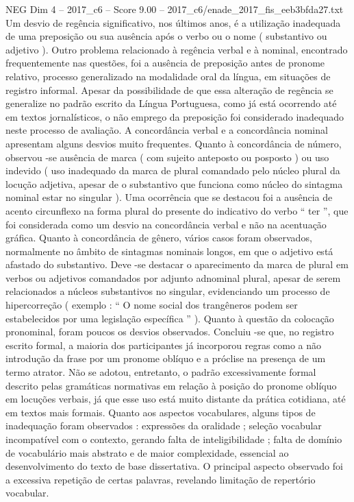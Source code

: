 \begin{textsample}{NEG Dim 4 – 2017\_c6 – Score 9.00 – 2017\_c6/enade\_2017\_fis\_eeb3bfda27.txt}
Um desvio de regência significativo, nos últimos anos, é a utilização inadequada de uma preposição ou sua ausência após o verbo ou o nome ( substantivo ou adjetivo ).
Outro problema relacionado à regência verbal e à nominal, encontrado frequentemente nas questões, foi a ausência de preposição antes de pronome relativo, processo generalizado na modalidade oral da língua, em situações de registro informal.
Apesar da possibilidade de que essa alteração de regência se generalize no padrão escrito da Língua Portuguesa, como já está ocorrendo até em textos jornalísticos, o não emprego da preposição foi considerado inadequado neste processo de avaliação.
A concordância verbal e a concordância nominal apresentam alguns desvios muito frequentes.
Quanto à concordância de número, observou -se ausência de marca ( com sujeito anteposto ou posposto ) ou uso indevido ( uso inadequado da marca de plural comandado pelo núcleo plural da locução adjetiva, apesar de o substantivo que funciona como núcleo do sintagma nominal estar no singular ).
Uma ocorrência que se destacou foi a ausência de acento circunflexo na forma plural do presente do indicativo do verbo “ ter ”, que foi considerada como um desvio na concordância verbal e não na acentuação gráfica.
Quanto à concordância de gênero, vários casos foram observados, normalmente no âmbito de sintagmas nominais longos, em que o adjetivo está afastado do substantivo.
Deve -se destacar o aparecimento da marca de plural em verbos ou adjetivos comandados por adjunto adnominal plural, apesar de serem relacionados a núcleos substantivos no singular, evidenciando um processo de hipercorreção ( exemplo : “ O nome social dos trangêneros podem ser estabelecidos por uma legislação específica ” ).
Quanto à questão da colocação pronominal, foram poucos os desvios observados.
Concluiu -se que, no registro escrito formal, a maioria dos participantes já incorporou regras como a não introdução da frase por um pronome oblíquo e a próclise na presença de um termo atrator.
Não se adotou, entretanto, o padrão excessivamente formal descrito pelas gramáticas normativas em relação à posição do pronome oblíquo em locuções verbais, já que esse uso está muito distante da prática cotidiana, até em textos mais formais.
Quanto aos aspectos vocabulares, alguns tipos de inadequação foram observados : expressões da oralidade ; seleção vocabular incompatível com o contexto, gerando falta de inteligibilidade ; falta de domínio de vocabulário mais abstrato e de maior complexidade, essencial ao desenvolvimento do texto de base dissertativa.
O principal aspecto observado foi a excessiva repetição de certas palavras, revelando limitação de repertório vocabular.

\end{textsample}
